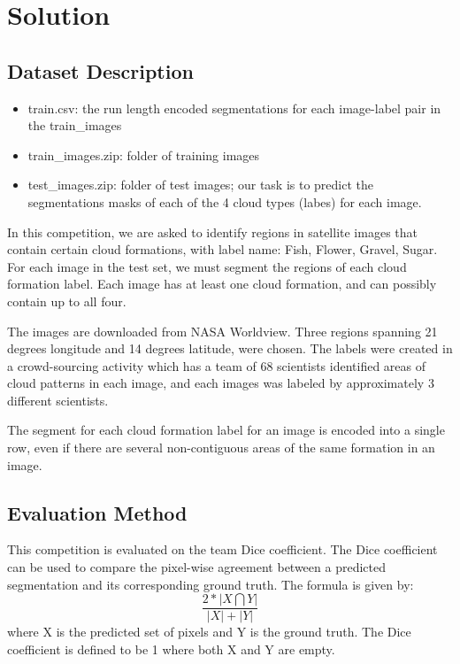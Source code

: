\documentclass[UTF8]{article}
\begin{document}
\section{Solution}
\subsection{Dataset Description}
	\begin{itemize}
		\item train.csv: the run length encoded segmentations for each image-label pair in the train\_images
		\item train\_images.zip: folder of training images
		\item test\_images.zip: folder of test images; our task is to predict the segmentations masks of each of the 4 cloud types (labes) for each image.
	\end{itemize}
In this competition, we are asked to identify regions in satellite images that contain certain cloud formations, with label name: Fish, Flower, Gravel, Sugar. For each image in the test set, we must segment the regions of each cloud formation label. Each image has at least one cloud formation, and can possibly contain up to all four.\par
\noindent The images are downloaded from NASA Worldview. Three regions spanning 21 degrees longitude and 14 degrees latitude, were chosen. The labels were created in a crowd-sourcing activity which has a team of 68 scientists identified areas of cloud patterns in each image, and each images was labeled by approximately 3 different scientists. \par
\noindent The segment for each cloud formation label for an image is encoded into a single row, even if there are several non-contiguous areas of the same formation in an image. 

\subsection{Evaluation Method}
This competition is evaluated on the team Dice coefficient. The Dice coefficient can be used to compare the pixel-wise agreement between a predicted segmentation and its corresponding ground truth. The formula is given by:
	\begin{displaymath}
	\frac{2*|X\bigcap Y|}{|X|+|Y|}
	\end{displaymath}
where X is  the predicted set of pixels and Y is the ground truth. The Dice coefficient is defined to be 1 where both X and Y are empty.
\end{document}
